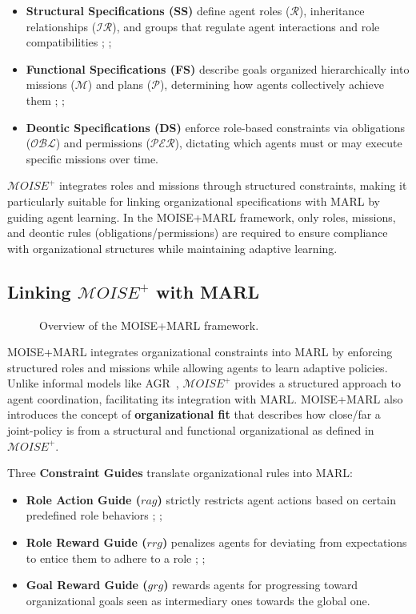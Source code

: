 \documentclass[pdflatex,sn-mathphys-num]{sn-jnl}%
\theoremstyle{thmstyleone}%
\theoremstyle{thmstyletwo}%
\theoremstyle{thmstylethree}%
\begin{document}
\begin{itemize}
    \item \textbf{Structural Specifications (SS)} define agent roles ($\mathcal{R}$), inheritance relationships ($\mathcal{IR}$), and groups that regulate agent interactions and role compatibilities ; ;
    \item \textbf{Functional Specifications (FS)} describe goals organized hierarchically into missions ($\mathcal{M}$) and plans ($\mathcal{P}$), determining how agents collectively achieve them ; ;
    \item \textbf{Deontic Specifications (DS)} enforce role-based constraints via obligations ($\mathcal{OBL}$) and permissions ($\mathcal{PER}$), dictating which agents must or may execute specific missions over time.
\end{itemize}

$\mathcal{M}OISE^+$ integrates roles and missions through structured constraints, making it particularly suitable for linking organizational specifications with MARL by guiding agent learning. In the MOISE+MARL framework, only roles, missions, and deontic rules (obligations/permissions) are required to ensure compliance with organizational structures while maintaining adaptive learning.

\subsection{Linking $\mathcal{M}OISE^+$ with MARL}

\begin{figure}[h!]
    \centering
    
    \caption{Overview of the MOISE+MARL framework.}
    \label{fig:mm_synthesis}
\end{figure}

MOISE+MARL integrates organizational constraints into MARL by enforcing structured roles and missions while allowing agents to learn adaptive policies. Unlike informal models like AGR~\cite{ferber2003}, $\mathcal{M}OISE^+$ provides a structured approach to agent coordination, facilitating its integration with MARL. MOISE+MARL also introduces the concept of \textbf{organizational fit} that describes how close/far a joint-policy is from a structural and functional organizational as defined in $\mathcal{M}OISE^+$.

Three \textbf{Constraint Guides} translate organizational rules into MARL:
\begin{itemize}
    \item \textbf{Role Action Guide ($rag$)} strictly restricts agent actions based on certain predefined role behaviors ; ;
    \item \textbf{Role Reward Guide ($rrg$)} penalizes agents for deviating from expectations to entice them to adhere to a role ; ;
    \item \textbf{Goal Reward Guide ($grg$)} rewards agents for progressing toward organizational goals seen as intermediary ones towards the global one.
\end{itemize}
\end{document}
